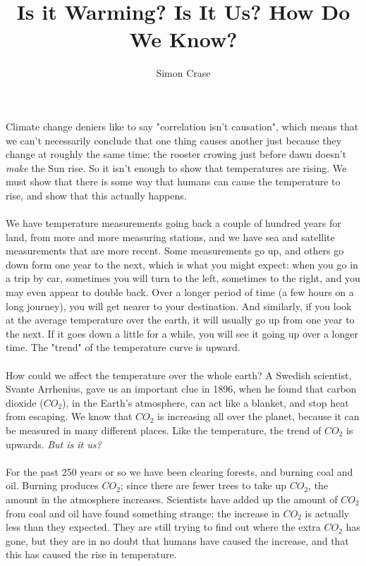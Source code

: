 \documentclass[]{article}
\title{Is it Warming? Is It Us? How Do We Know?}
\author{Simon Crase}
\begin{document}
\maketitle


Climate change deniers like to say "correlation isn't causation", which means that we can't necessarily conclude that one thing causes another just because they change at roughly the same time: the rooster crowing just before dawn doesn't \textit{make} the Sun rise. So it isn't enough to show that temperatures are rising. We must show that there is some way that humans can cause the temperature to rise, and show that this actually happens.
\paragraph{}
We have temperature measurements going back a couple of hundred years for land, from more and more measuring stations, and we have sea  and satellite measurements that are more recent. Some measurements go up, and others go down form one year to the next, which is what you might expect: when you go in a trip by car, sometimes you will turn to the left, sometimes to the right, and you may even appear to double back. Over a longer period of time (a few hours on a long journey), you will get nearer to your destination. And similarly, if you look at the average temperature over the earth, it will usually go up from one year to the next. If it goes down a little for a while, you will see it going up over a longer time. The "trend" of the temperature curve is upward.
\paragraph{}
How could we affect the temperature over the whole earth? A Swedish scientist, Svante Arrhenius, gave us an important clue in 1896, when he found that carbon dioxide ($CO_{2}$), in the Earth's atmosphere, can act like a blanket, and stop heat from escaping. We know that $CO_{2}$ is increasing all over the planet, because it can be measured in many different places. Like the temperature, the trend of $CO_{2}$ is upwards. \textit{But is it us?}
\paragraph{}
For the past 250 years or so we have been clearing forests, and burning coal and oil. Burning produces $CO_{2}$; since there are fewer trees to take up $CO_{2}$, the amount in the atmosphere increases. Scientists have added up the amount of $CO_{2}$ from coal and oil have found something strange: the increase in $CO_{2}$ is actually less than they expected. They are still trying to find out where the extra $CO_{2}$ has gone, but they are in no doubt that humans have caused the increase, and that this has caused the rise in temperature.
\end{document}
